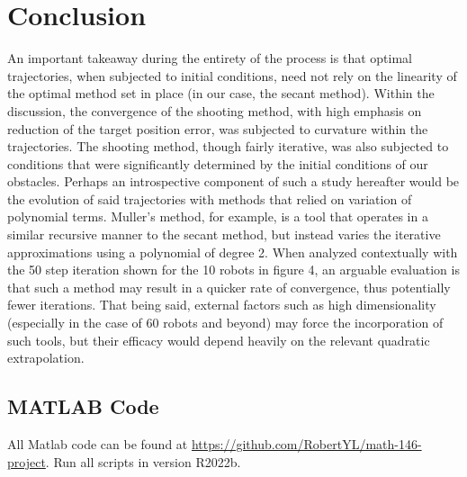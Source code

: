\documentclass[11pt]{article}
\begin{document}
\section{Conclusion}
An important takeaway during the entirety of the process is that optimal trajectories, when subjected to initial conditions, need not rely on the linearity of the optimal method set in place (in our case, the secant method). Within the discussion, the convergence of the shooting method, with high emphasis on reduction of the target position error, was subjected to curvature within the trajectories. The shooting method, though fairly iterative, was also subjected to conditions that were significantly determined by the initial conditions of our obstacles. Perhaps an introspective component of such a study hereafter would be the evolution of said trajectories with methods that relied on variation of polynomial terms. Muller's method, for example, is a tool that operates in a similar recursive manner to the secant method, but instead varies the iterative approximations using a polynomial of degree 2. When analyzed contextually with the 50 step iteration shown for the 10 robots in figure 4, an arguable evaluation is that such a method may result in a quicker rate of convergence, thus potentially fewer iterations. That being said, external factors such as high dimensionality (especially in the case of 60 robots and beyond) may force the incorporation of such tools, but their efficacy would depend heavily on the relevant quadratic extrapolation. 

\clearpage

\begin{appendices}

\section{MATLAB Code}

All Matlab code can be found at \url{https://github.com/RobertYL/math-146-project}. Run all scripts in version R2022b.

\end{appendices}
\end{document}
